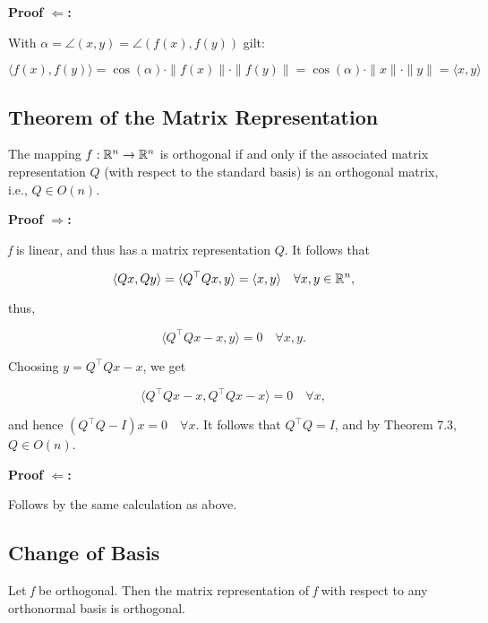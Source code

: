 \QED
\vspace{\baselineskip}

\textbf{Proof \(\Leftarrow\):} 

With \(\alpha = \angle(x, y) = \angle(f(x), f(y))\) gilt:

\[
    \langle f(x), f(y) \rangle = \cos(\alpha) \cdot \|f(x)\| \cdot \|f(y)\| = \cos(\alpha) 
    \cdot \|x\| \cdot \|y\| = \langle x, y \rangle
\]

\QED

\subsection{Theorem of the Matrix Representation}

The mapping \( f : \mathbb{R}^n \to \mathbb{R}^n \) is orthogonal if and only if  
the associated matrix representation \( Q \) (with respect to the standard basis) is an orthogonal matrix, i.e., \( Q \in O(n) \).
\vspace{\baselineskip}

\textbf{Proof \(\Rightarrow\):} 

\emph{f} is linear, and thus has a matrix representation \( Q \). It follows that

\[
    \langle Qx, Qy \rangle = \langle Q^\top Qx, y \rangle = \langle x, y \rangle \quad \forall x, y 
    \in \mathbb{R}^n,
\]

thus,

\[
    \langle Q^\top Qx - x, y \rangle = 0 \quad \forall x, y.
\]

Choosing \( y = Q^\top Qx - x \), we get

\[
    \langle Q^\top Qx - x, Q^\top Qx - x \rangle = 0 \quad \forall x,
\]

and hence \( (Q^\top Q - I)x = 0 \quad \forall x \).  
It follows that \( Q^\top Q = I \), and by Theorem 7.3, \( Q \in O(n) \).

\QED
\vspace{\baselineskip}

\textbf{Proof \(\Leftarrow\):} 

Follows by the same calculation as above.

\QED

\subsection{Change of Basis}

Let \emph{f} be orthogonal. Then the matrix representation of \emph{f}  
with respect to any orthonormal basis is orthogonal.
\vspace{\baselineskip}

